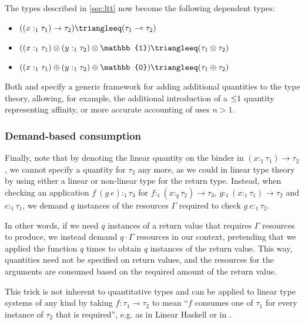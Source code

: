 The types described in \cref{sec:ltt} now become the following dependent types:
\begin{itemize}
	\item $((x :_1 \tau_1) \to \tau_2) \triangleeq (\tau_1 \multimap \tau_2)$
	\item $((x :_1 \tau_1) \otimes (y :_1 \tau_2) \otimes \mathbb{1}) \triangleeq (\tau_1 \otimes \tau_2)$
	\item $((x :_1 \tau_1) \oplus (y :_1 \tau_2) \oplus \mathbb{0}) \triangleeq (\tau_1 \oplus \tau_2)$
\end{itemize}

Both \cite{lindley_i_2016} and \cite{atkey_syntax_2018} specify a generic framework for adding additional quantities to the type theory, allowing, for example, the additional introduction of a $\leq\hspace{-0.3em}1$ quantity representing affinity, or more accurate accounting of uses $n > 1$.

\subsubsection{Demand-based consumption}
Finally, note that by denoting the linear quantity on the binder in $(x :_1 \tau_1) \to \tau_2$, we cannot specify a quantity for $\tau_2$ any more, as we could in linear type theory by using either a linear or non-linear type for the return type. Instead, when checking an application $f\ (g\ e) :_1 \tau_3$ for $f :_1 (x :_q \tau_2) \to \tau_3$, $g :_1 (x :_1 \tau_1) \to \tau_2$ and $e :_1 \tau_1$, we demand $q$ instances of the resources $\Gamma$ required to check $g\ e :_1 \tau_2$. 

In other words, if we need $q$ instances of a return value that requires $\Gamma$ resources to produce, we instead demand $q \cdot \Gamma$ resources in our context, pretending that we applied the function $q$ times to obtain $q$ instances of the return value. This way, quantities need not be specified on return values, and the resources for the arguments are consumed based on the required amount of the return value.

This trick is not inherent to quantitative types and can be applied to linear type systems of any kind by taking $f : \tau_1 \multimap \tau_2$ to mean ``$f$ consumes one of $\tau_1$ for every instance of $\tau_2$ that is required'', e.g. as in Linear Haskell \citep{bernardy_linear_2018} or in \citep{ghica_bounded_2014}. 

